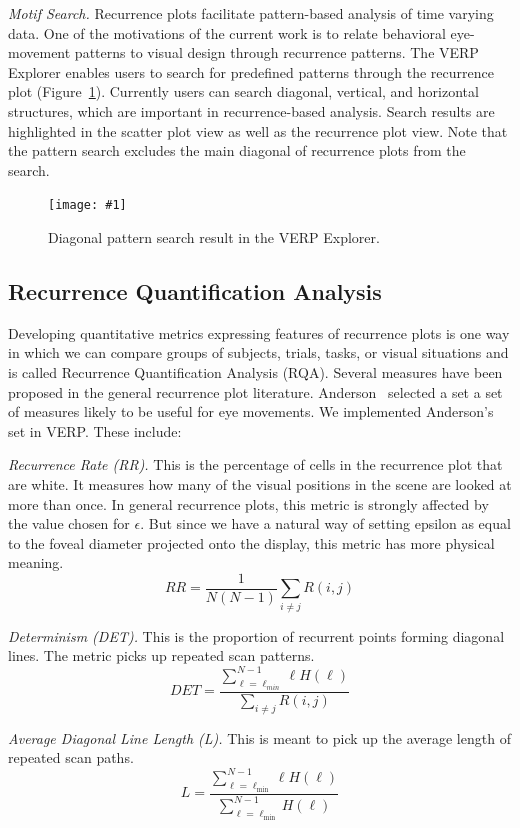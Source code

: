 \documentclass[journal]{vgtc}                %
\newcommand{\insertpicture}[2]{\begin{center}\texttt{[image: \#1]}\end{center}}
\begin{document}
\emph{Motif Search.} Recurrence plots facilitate pattern-based analysis of
time varying data. One of the motivations of the current work is to relate
behavioral eye-movement patterns to visual design through recurrence
patterns. The VERP Explorer enables users to search for predefined patterns through the recurrence plot
(Figure~\ref{fig:motifsearch}). Currently users can search
diagonal, vertical, and horizontal structures, which are important in recurrence-based analysis. Search results are highlighted  in the scatter plot view  as well as the 
recurrence plot view. Note that the pattern search excludes the main 
diagonal of recurrence plots from the search. 
\begin{figure}
\insertpicture{figures/motifsearch.pdf}{0.4}
\caption{Diagonal pattern search result in the VERP Explorer. 
\label{fig:motifsearch}} 
\end{figure}

\subsection{Recurrence Quantification Analysis} 
Developing quantitative metrics expressing features of recurrence plots is one way in which we can compare groups of subjects, trials, tasks, or visual situations and is called Recurrence Quantification Analysis (RQA).  Several measures have been proposed in the general recurrence plot literature. 
Anderson~\cite{Anderson_2013} selected a set a set of measures likely to be useful for eye movements. We implemented Anderson's set in VERP. These include:

\emph{Recurrence Rate (RR).} This is the percentage of cells in the
recurrence plot that are white. It measures how many of the visual
positions in the scene are looked at more than once. In general recurrence
plots, this metric is strongly affected by the value chosen for $\epsilon$.
But since we have a natural way of setting epsilon as equal to the foveal
diameter projected onto the display, this metric has more physical meaning.
\[
	RR = {\frac{1}{N(N-1)}}{\sum_{i\neq j}{R(i,j)}}
\]

\emph{Determinism (DET).} This is the proportion of recurrent points
forming diagonal lines. The metric picks up repeated scan patterns.
\[
	DET = 
	\frac{
		\sum_{\ell=\ell_{min}}^{N-1}{\ell H(\ell)}
	}{
		\sum_{i\neq j} { R(i,j) }
	}
\]

\emph{Average Diagonal Line Length (L).} This is meant to pick up the
average length of repeated scan paths.
\[
	L = 
	\frac{
		\sum_{\ell=\ell_{\min} }^{ N-1 }{ \ell H(\ell) }
 	}{
		\sum_{\ell=\ell_{\min} }^{ N-1 }{ H(\ell) }
 	}
\]
\end{document}
